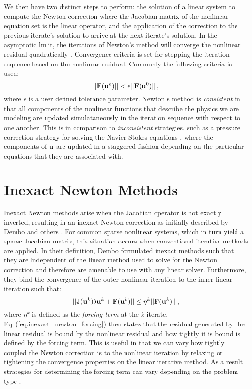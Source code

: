 We then have two distinct steps to perform: the solution of a linear
system to compute the Newton correction where the Jacobian matrix of
the nonlinear equation set is the linear operator, and the application
of the correction to the previous iterate's solution to arrive at the
next iterate's solution. In the asymptotic lmiit, the iterations of
Newton's method will converge the nonlinear residual quadratically
\citep{kelley_iterative_1995}. Convergence criteria is set for
stopping the iteration sequence based on the nonlinear
residual. Commonly the following criteria is used:
\begin{equation}
  ||\mathbf{F}(\mathbf{u}^{k})|| < \epsilon ||\mathbf{F}(\mathbf{u}^{0})||\:,
  \label{eq:newton_stopping_criteria}
\end{equation}
where $\epsilon$ is a user defined tolerance parameter. Newton's
method is \textit{consistent} in that all components of the nonlinear
functions that describe the physics we are modeling are updated
simulataneously in the iteration sequence with respect to one
another. This is in comparison to \textit{inconsistent} strategies,
such as a pressure correction strategy for solving the Navier-Stokes
equations \citep{pletcher_computational_1997}, where the components of
$\mathbf{u}$ are updated in a staggered fashion depending on the
particular equations that they are associated with.

\section{Inexact Newton Methods}
\label{sec:newton_methods}
Inexact Newton methods arise when the Jacobian operator is not exactly
inverted, resulting in an inexact Newton correction as initially
described by Dembo and others \citep{dembo_inexact_1982}. For common
sparse nonlinear systems, which in turn yield a sparse Jacobian
matrix, this situation occurs when conventional iterative methods are
applied. In their definition, Dembo formulated inexact methods such
that they are independent of the linear method used to solve for the
Newton correction and therefore are amenable to use with any linear
solver. Furthermore, they bind the convergence of the outer nonlinear
iteration to the inner linear iteration such that:
\begin{equation}
  ||\mathbf{J}(\mathbf{u}^k)\delta \mathbf{u}^k + \mathbf{F}(\mathbf{u}^k)|| \leq \eta^k
  ||\mathbf{F}(\mathbf{u}^k)||\:,
  \label{eq:inexact_newton_forcing}
\end{equation}
where $\eta^k$ is defined as the \textit{forcing term} at the $k$
iterate. Eq~(\ref{eq:inexact_newton_forcing}) then states that the
residual generated by the linear residual is bound by the nonlinear
residual and how tightly it is bound is defined by the forcing
term. This is useful in that we can vary how tightly coupled the
Newton correction is to the nonlinear iteration by relaxing or
tightening the convergence properties on the linear iterative
method. As a result strategies for determining the forcing term can
vary depending on the problem type \citep{eisenstat_choosing_1996}.

